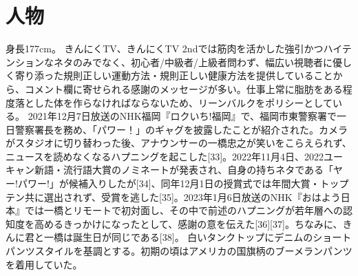 \section{人物}
身長177cm。
きんにくTV、きんにくTV 2ndでは筋肉を活かした強引かつハイテンションなネタのみでなく、初心者/中級者/上級者問わず、幅広い視聴者に優しく寄り添った規則正しい運動方法・規則正しい健康方法を提供していることから、コメント欄に寄せられる感謝のメッセージが多い。仕事上常に脂肪をある程度落とした体を作らなければならないため、リーンバルクをポリシーとしている。
2021年12月7日放送のNHK福岡『ロクいち!福岡』で、福岡市東警察署で一日警察署長を務め、「パワー！」のギャグを披露したことが紹介された。カメラがスタジオに切り替わった後、アナウンサーの一橋忠之が笑いをこらえられず、ニュースを読めなくなるハプニングを起こした[33]。2022年11月4日、2022ユーキャン新語・流行語大賞のノミネートが発表され、自身の持ちネタである「ヤー!パワー!」が候補入りしたが[34]、同年12月1日の授賞式では年間大賞・トップテン共に選出されず、受賞を逃した[35]。2023年1月6日放送のNHK『おはよう日本』では一橋とリモートで初対面し、その中で前述のハプニングが若年層への認知度を高めるきっかけになったとして、感謝の意を伝えた[36][37]。ちなみに、きんに君と一橋は誕生日が同じである[38]。
白いタンクトップにデニムのショートパンツスタイルを基調とする。初期の頃はアメリカの国旗柄のブーメランパンツを着用していた。